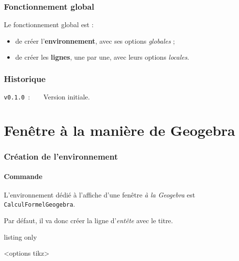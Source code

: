 \documentclass[french,a4paper,11pt]{article}
\begin{document}
\section{Fonctionnement global}

\begin{importantblock}
Le fonctionnement global est :

\begin{itemize}
	\item de créer l'\textbf{environnement}, avec ses options \textit{globales} ;
	\item de créer les \textbf{lignes}, une par une, avec leurs options \textit{locales}.
\end{itemize}
\vspace*{-\baselineskip}\leavevmode
\end{importantblock}

\vfill

\section{Historique}

\verb|v0.1.0|~:~~~~Version initiale.

\hspace*{1cm}

\pagebreak

\part{Fenêtre à la manière de Geogebra}

\section{Création de l'environnement}

\subsection{Commande}

\begin{cautionblock}
L'environnement dédié à l'affiche d'une fenêtre \textit{à la Geogebra} est \texttt{CalculFormelGeogebra}.

Par défaut, il va donc créer la ligne d'\textit{entête} avec le titre.
\end{cautionblock}

\begin{PresentationCode}{listing only}
\begin{CalculFormelGeogebra}<options tikz>
\end{CalculFormelGeogebra}
\end{PresentationCode}
\end{document}
